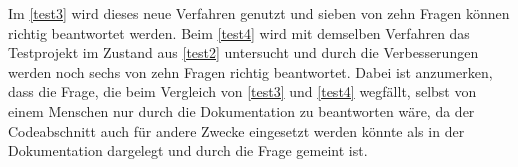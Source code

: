 \documentclass[../main.tex]{subfiles}
\begin{document}
Im \ref{test3} wird dieses neue Verfahren genutzt und sieben von zehn Fragen können richtig beantwortet werden.
Beim \ref{test4} wird mit demselben Verfahren das Testprojekt im Zustand aus \ref{test2} untersucht und durch die Verbesserungen werden noch sechs von zehn Fragen richtig beantwortet.
Dabei ist anzumerken, dass die Frage, die beim Vergleich von \ref{test3} und \ref{test4} wegfällt, selbst von einem Menschen nur durch die Dokumentation zu beantworten wäre, da der Codeabschnitt auch für andere Zwecke eingesetzt werden könnte als in der Dokumentation dargelegt und durch die Frage gemeint ist.
\end{document}
